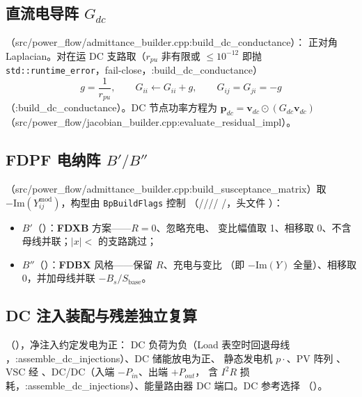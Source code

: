\subsection{直流电导阵 $G_{dc}$}
（src/power\_flow/admittance\_builder.cpp:build\_dc\_conductance）：
正对角 Laplacian。对在运 DC 支路取（$r_{pu}$ 非有限或 $\le 10^{-12}$ 即抛
\texttt{std::runtime\_error}，fail-close，:build\_dc\_conductance）
\[
g=\frac{1}{r_{pu}},\qquad G_{ii}\leftarrow G_{ii}+g,\qquad G_{ij}=G_{ji}=-g
\]
（:build\_dc\_conductance）。DC 节点功率方程为 $\mathbf p_{dc}=\mathbf v_{dc}\odot(G_{dc}\mathbf v_{dc})$
（src/power\_flow/jacobian\_builder.cpp:evaluate\_residual\_impl）。

\subsection{FDPF 电纳阵 $B'/B''$}
（src/power\_flow/admittance\_builder.cpp:build\_susceptance\_matrix）取
$-\mathrm{Im}(Y^{\mathrm{mod}}_{ij})$，构型由 \texttt{BpBuildFlags} 控制
（////%
/，头文件
）：
\begin{itemize}
  \item $B'$（）：\textbf{FDXB} 方案——$R=0$、忽略充电、
        变比幅值取 1、相移取 0、不含母线并联；$|x|<$ 的支路跳过；
  \item $B''$（）：\textbf{FDBX} 风格——保留 $R$、充电与变比
        （即 $-\mathrm{Im}(Y)$ 全量）、相移取 0，并加母线并联 $-B_s/S_{\mathrm{base}}$。
\end{itemize}

\subsection{DC 注入装配与残差独立复算}
（），净注入约定发电为正：
DC 负荷为负（Load 表空时回退母线 ，:assemble\_dc\_injections）、DC 储能放电为正、
静态发电机 $p\cdot$、PV 阵列 、VSC 经
、DC/DC（入端 $-P_{in}$、出端 $+P_{out}$，
含 $I^2R$ 损耗，:assemble\_dc\_injections）、能量路由器 DC 端口。DC 参考选择
（）。

